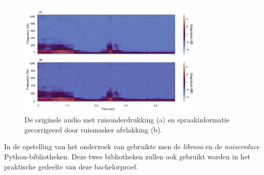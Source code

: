 \begin{figure}
    \centering
    \includegraphics[width=0.8\textwidth]{./img/The_original_noise-removed_audio.jpg}
    \caption{\label{fig:The_original_noise-removed_audio}De originele audio met ruisonderdrukking (a) en spraakinformatie gecorrigeerd door ruismasker afvlakking (b).~\autocite{Jung2021}}
\end{figure}

In de opstelling van het onderzoek van \textcite{Jung2021} gebruikte men de \textit{librosa} en de \textit{noisereduce} Python-bibliotheken. Deze twee bibliotheken zullen ook gebruikt worden in het praktische gedeelte van deze bachelorproef.
